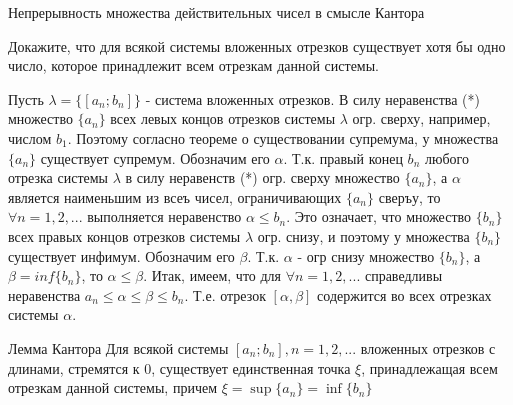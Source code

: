 \documentclass[10pt]{article}
\begin{document}
\begin{problem} Непрерывность множества действительных чисел в смысле Кантора

Докажите, что для всякой системы вложенных отрезков существует хотя бы одно число, которое принадлежит всем отрезкам данной системы.


\end{problem}

\begin{solution}
Пусть $\lambda=\{[a_n;b_n]\}$ - система вложенных отрезков. В силу неравенства (*) множество $\{a_n\}$ всех левых концов отрезков системы $\lambda$ огр. сверху, например, числом $b_1$. Поэтому согласно теореме о существовании супремума, у множества $\{a_n\}$  существует супремум. Обозначим его $\alpha$. Т.к. правый конец $ b_n$ любого отрезка системы $\lambda$ в силу неравенств (*) огр. сверху множество $\{a_n\}$, а $\alpha$ является наименьшим из всеъ чисел, ограничивающих $\{a_n\}$ сверъу, то $\forall n=1,2,...$ выполняется неравенство $\alpha \leq b_n$. Это означает, что множество $\{b_n\}$ всех правых концов отрезков системы $\lambda$ огр. снизу, и поэтому у множества $\{b_n\}$ существует инфимум. Обозначим его $\beta$. Т.к. $\alpha$ - огр снизу множество $\{b_n\}$, а     $\beta=inf\{b_n\}$, то $\alpha \leq \beta$. Итак, имеем, что для $\forall n=1,2,...$ справедливы неравенства $a_n \leq \alpha \leq \beta \leq b_n$. Т.е. отрезок $[\alpha,\beta]$ содержится во всех отрезках системы $\alpha$.
\end{solution}


\begin{problem} Лемма Кантора
Для всякой системы $[a_n;b_n], n=1,2,...$ вложенных отрезков с длинами, стремятся к 0, существует единственная точка $\xi$, принадлежащая всем отрезкам данной системы, причем $\xi=\sup\{a_n\}=\inf\{b_n\}$
\end{problem}
\end{document}
